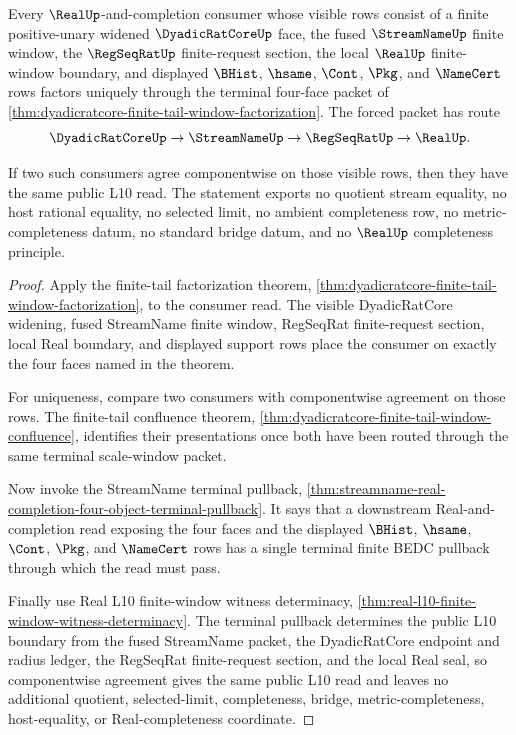 \begin{theorem}
\label{thm:dyadicratcore-finite-tail-window-terminality}
Every $\RealUp$-and-completion consumer whose visible rows consist of a finite positive-unary widened $\DyadicRatCoreUp$ face, the fused $\StreamNameUp$ finite window, the $\RegSeqRatUp$ finite-request section, the local $\RealUp$ finite-window boundary, and displayed $\BHist$, $\hsame$, $\Cont$, $\Pkg$, and $\NameCert$ rows factors uniquely through the terminal four-face packet of \autoref{thm:dyadicratcore-finite-tail-window-factorization}. The forced packet has route
$$
\DyadicRatCoreUp \to \StreamNameUp \to \RegSeqRatUp \to \RealUp .
$$

If two such consumers agree componentwise on those visible rows, then they have the same public L10 read. The statement exports no quotient stream equality, no host rational equality, no selected limit, no ambient completeness row, no metric-completeness datum, no standard bridge datum, and no $\RealUp$ completeness principle.
\end{theorem}
\begin{proof}
Apply the finite-tail factorization theorem, \autoref{thm:dyadicratcore-finite-tail-window-factorization}, to the consumer read. The visible DyadicRatCore widening, fused StreamName finite window, RegSeqRat finite-request section, local Real boundary, and displayed support rows place the consumer on exactly the four faces named in the theorem.

For uniqueness, compare two consumers with componentwise agreement on those rows. The finite-tail confluence theorem, \autoref{thm:dyadicratcore-finite-tail-window-confluence}, identifies their presentations once both have been routed through the same terminal scale-window packet.

Now invoke the StreamName terminal pullback, \autoref{thm:streamname-real-completion-four-object-terminal-pullback}. It says that a downstream Real-and-completion read exposing the four faces and the displayed $\BHist$, $\hsame$, $\Cont$, $\Pkg$, and $\NameCert$ rows has a single terminal finite BEDC pullback through which the read must pass.

Finally use Real L10 finite-window witness determinacy, \autoref{thm:real-l10-finite-window-witness-determinacy}. The terminal pullback determines the public L10 boundary from the fused StreamName packet, the DyadicRatCore endpoint and radius ledger, the RegSeqRat finite-request section, and the local Real seal, so componentwise agreement gives the same public L10 read and leaves no additional quotient, selected-limit, completeness, bridge, metric-completeness, host-equality, or Real-completeness coordinate.
\end{proof}

